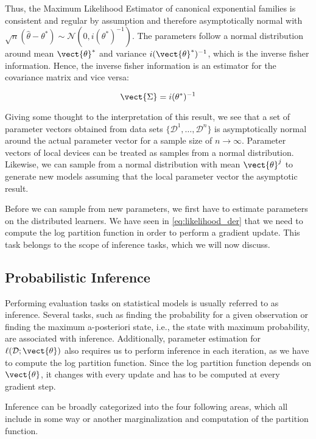         Thus, the Maximum Likelihood Estimator of canonical exponential families is consistent and  regular by assumption and therefore asymptotically normal with $\sqrt{n}(\hat{\theta} - \theta^*) \sim \mathcal{N}(0, i(\theta^*)^{-1})$.
        The parameters follow a normal distribution around mean $\vect{\theta}^*$ and variance $i(\vect{\theta}^*)^{-1}$, which is the inverse fisher information.
        Hence, the inverse fisher information is an estimator for the covariance matrix and vice versa:
        
        \begin{equation}
            \vect{\Sigma} =  i(\theta^*)^{-1}
        \end{equation}

        Giving some thought to the interpretation of this result, we see that a set of parameter vectors obtained from data sets $\{\mathcal{D}^1, \ldots, \mathcal{D}^n\}$ is asymptotically normal around the actual parameter vector for a sample size of $n \rightarrow \infty$.
        Parameter vectors of local devices can be treated as samples from a normal distribution.
        Likewise, we can sample from a normal distribution with mean $\vect{\theta}^j$ to generate new models assuming that the local parameter vector the asymptotic result.
        
        Before we can sample from new parameters, we first have to estimate parameters on the distributed learners. 
        We have seen in \autoref{eq:likelihood_der} that we need to compute the log partition function in order to perform a gradient update.
        This task belongs to the scope of inference tasks, which we will now discuss.

\subsection{Probabilistic Inference}
\label{ssec:inf}
Performing evaluation tasks on statistical models is usually referred to as inference.
Several tasks, such as finding the probability for a given observation or finding the maximum a-posteriori state, i.e., the state with maximum probability, are associated with inference.
Additionally, parameter estimation for $\ell(\mathcal{D}; \vect{\theta})$ also requires us to perform inference in each iteration, as we have to compute the log partition function.
Since the log partition function depends on $\vect{\theta}$, it changes with every update and has to be computed at every gradient step.

Inference can be broadly categorized into the four following areas, which all include in some way or another marginalization and computation of the partition function.

